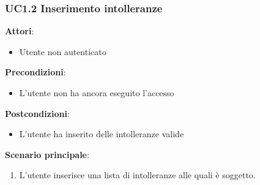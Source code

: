 \subsubsection{UC1.2 Inserimento intolleranze}\label{usecase:1_2}
\textbf{Attori}:
\begin{itemize}
    \item Utente non autenticato
\end{itemize}
\textbf{Precondizioni}:
\begin{itemize}
    \item L'utente non ha ancora eseguito l'accesso
\end{itemize}
\textbf{Postcondizioni}:
\begin{itemize}
    \item L'utente ha inserito delle intolleranze valide
\end{itemize}
\textbf{Scenario principale}:
\begin{enumerate}
    \item L'utente inserisce una lista di intolleranze alle quali è soggetto.
\end{enumerate}